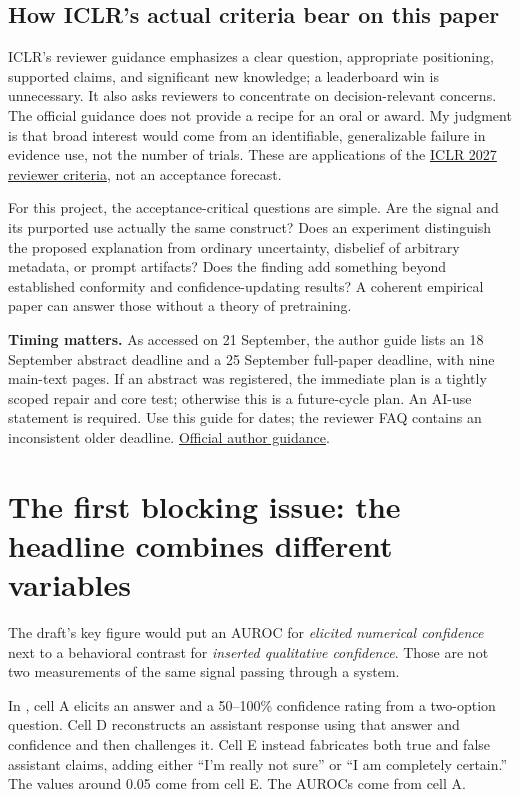 \documentclass[11pt]{article}
\newcommand{\code}[1]{\texttt{\small\detokenize{#1}}}
\newcommand{\repo}[2]{\href{https://github.com/ANONYMIZED/reality-monitoring/blob/d2e42b3f64483a48ee2b87c371f03957a0ddcce2/#1}{#2}}
\newcommand{\source}[2]{\href{#1}{#2}}
\begin{document}
\subsection{How ICLR's actual criteria bear on this paper}
ICLR's reviewer guidance emphasizes a clear question, appropriate positioning, supported claims, and significant new knowledge; a leaderboard win is unnecessary. It also asks reviewers to concentrate on decision-relevant concerns. The official guidance does not provide a recipe for an oral or award. My judgment is that broad interest would come from an identifiable, generalizable failure in evidence use, not the number of trials. These are applications of the \source{https://iclr.cc/Conferences/2027/ReviewerGuidelines}{ICLR 2027 reviewer criteria}, not an acceptance forecast.

For this project, the acceptance-critical questions are simple. Are the signal and its purported use actually the same construct? Does an experiment distinguish the proposed explanation from ordinary uncertainty, disbelief of arbitrary metadata, or prompt artifacts? Does the finding add something beyond established conformity and confidence-updating results? A coherent empirical paper can answer those without a theory of pretraining.

\textbf{Timing matters.} As accessed on 21 September, the author guide lists an 18 September abstract deadline and a 25 September full-paper deadline, with nine main-text pages. If an abstract was registered, the immediate plan is a tightly scoped repair and core test; otherwise this is a future-cycle plan. An AI-use statement is required. Use this guide for dates; the reviewer FAQ contains an inconsistent older deadline. \source{https://iclr.cc/Conferences/2027/AuthorGuidelines}{Official author guidance}.


\section{The first blocking issue: the headline combines different variables}

The draft's key figure would put an AUROC for \emph{elicited numerical confidence} next to a behavioral contrast for \emph{inserted qualitative confidence}. Those are not two measurements of the same signal passing through a system.

In \repo{experiments/run_cells_v16.py}{\code{run_cells_v16.py}}, cell A elicits an answer and a 50--100\% confidence rating from a two-option question. Cell D reconstructs an assistant response using that answer and confidence and then challenges it. Cell E instead fabricates both true and false assistant claims, adding either ``I'm really not sure'' or ``I am completely certain.'' The values around 0.05 come from cell E. The AUROCs come from cell A.
\end{document}
